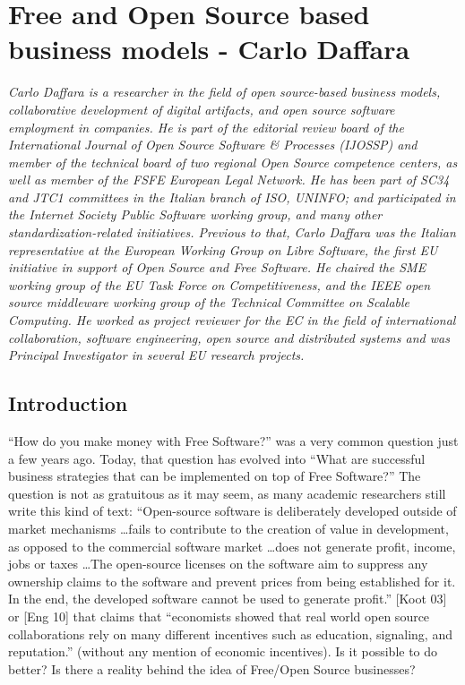 \chapter{Free and Open Source based business models - Carlo Daffara}

\textit{Carlo Daffara is a researcher in the field of open source-based business
models, collaborative development of digital artifacts, and open source software
employment in companies. He is part of the editorial review board of the
International Journal of Open Source Software \& Processes (IJOSSP) and member
of the technical board of two regional Open Source competence centers, as well
as member of the FSFE European Legal Network. He has been part of SC34 and JTC1
committees in the Italian branch of ISO, UNINFO; and participated in the
Internet Society Public Software working group, and many other
standardization-related initiatives. Previous to that, Carlo Daffara was the
Italian representative at the European Working Group on Libre Software, the
first EU initiative in support of Open Source and Free Software. He chaired the
SME working group of the EU Task Force on Competitiveness, and the IEEE open
source middleware working group of the Technical Committee on Scalable Computing. He worked
as project reviewer for the EC in the field of international collaboration,
software engineering, open source and distributed systems and was Principal
Investigator in several EU research projects.}

\section*{Introduction}

``How do you make money with Free Software?'' was a very common question just a
few years ago. Today, that question has evolved into ``What are successful
business strategies that can be implemented on top of Free Software?'' The
question is not as gratuitous as it may seem, as many academic researchers still
write this kind of text: ``Open-source software is deliberately developed outside
of market mechanisms \dots fails to contribute to the creation of value in
development, as opposed to the commercial software market \dots does not generate
profit, income, jobs or taxes \dots The open-source licenses on the software aim to
suppress any ownership claims to the software and prevent prices from being
established for it. In the end, the developed software cannot be used to
generate profit.'' [Koot 03] or [Eng 10] that claims that ``economists showed that
real world open source collaborations rely on many different incentives such as
education, signaling, and reputation.'' (without any mention of economic
incentives). Is it possible to do better? Is there a reality behind the idea of
Free/Open Source businesses?

